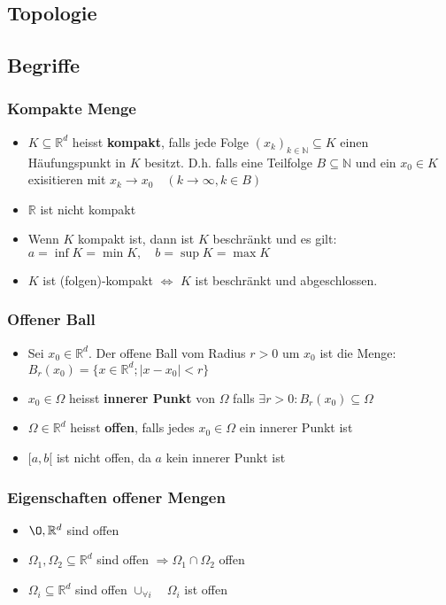 \documentclass[a3paper, 11pt, landscape]{scrartcl}
\newcommand{\Rd}{\mathbb{R}^d}
\newcommand{\xZeroRd}{x_0\in\mathbb{R}^d}
\begin{document}
\begin{multicols*}{3}
	
	
	\section{Topologie}
	\subsection{Begriffe}
	\subsubsection{Kompakte Menge}
	\begin{itemize}
	    \item $K\subseteq \mathbb{R}^d$ heisst \textbf{kompakt}, falls jede Folge $(x_k)_{k\in\mathbb{N}}\subseteq K$ einen Häufungspunkt in $K$ besitzt. D.h. falls eine Teilfolge $B\subseteq\mathbb{N}$ und ein $x_0\in K$ exisitieren mit $x_k\to x_0\quad (k\to\infty, k\in B)$
	    \item $\mathbb{R}$ ist nicht kompakt
	    \item Wenn $K$ kompakt ist, dann ist $K$ beschränkt und es gilt: $a=\inf K = \min K, \quad b=\sup K =\max K$
	    \item $K$ ist (folgen)-kompakt $\iff$ $K$ ist beschränkt und abgeschlossen.
	\end{itemize}
	
	\subsubsection{Offener Ball}
	\begin{itemize}
	    \item Sei $\xZeroRd$. Der offene Ball vom Radius $r>0$ um $x_0$ ist die Menge: $B_r(x_0)=\{x\in\Rd;|x-x_0|<r\}$
	    \item $x_0 \in \Omega$ heisst \textbf{innerer Punkt} von $\Omega$ falls $\exists r > 0: B_r(x_0)\subseteq \Omega$
	    \item $\Omega \in \Rd$ heisst \textbf{offen}, falls jedes $x_0\in \Omega$ ein innerer Punkt ist 
	    \item $[a,b[$ ist nicht offen, da $a$ kein innerer Punkt ist
	\end{itemize}
	
	\subsubsection{Eigenschaften offener Mengen}
	\begin{itemize}
	    \item $\O, \Rd $ sind offen
	    \item $\Omega_1,\Omega_2\subseteq\Rd$ sind offen $\Rightarrow \Omega_1 \cap \Omega_2$ offen
	    \item $\Omega_i\subseteq\Rd$ sind offen $\cup_{\forall i} \quad \Omega_i$ ist offen
	\end{itemize}
	

\end{multicols*}
\end{document}
